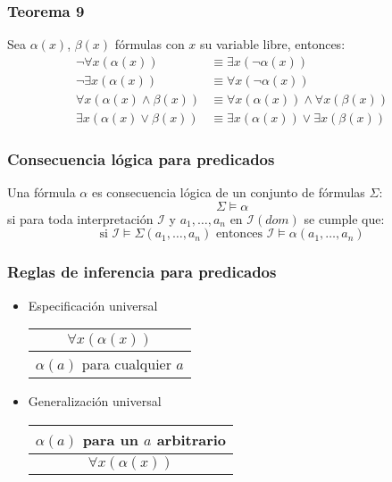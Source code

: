 \begin{multicols}{2}
    \subsubsection*{Teorema 9}
    Sea $\alpha(x)$, $\beta(x)$ fórmulas con $x$ su variable libre, entonces:
    \begin{align*}
        \neg \forall x(\alpha(x)) &\equiv \exists x(\neg \alpha(x))\\
        \neg \exists x(\alpha(x)) &\equiv \forall x(\neg \alpha(x))\\
        \forall x(\alpha(x) \wedge \beta(x)) &\equiv \forall x(\alpha(x)) \wedge \forall x (\beta(x))\\
        \exists x(\alpha(x) \vee \beta(x)) &\equiv \exists x(\alpha(x)) \vee \exists x(\beta(x))    
    \end{align*}
    
    \subsubsection*{Consecuencia lógica para predicados}
    Una fórmula $\alpha$ es consecuencia lógica de un conjunto de fórmulas $\Sigma$:
        $$
        \Sigma \models \alpha
        $$
        si para toda interpretación $\mathcal{I}$ y $a_1,\ldots,a_n$ en $\mathcal{I}(dom)$ se cumple que:
        $$
        \text{si } \mathcal{I} \models \Sigma(a_1,\ldots, a_n) \text{ entonces } \mathcal{I} \models \alpha(a_1,\ldots,a_n)
        $$
    
    \subsubsection*{Reglas de inferencia para predicados}   
    
    \begin{itemize}
    \item Especificación universal
    \vspace{5px}
    
        \begin{tabular}{c}
            $\forall x (\alpha(x))$ \\ \hline
            $\alpha(a)$ para cualquier $a$
        \end{tabular}
    
    \item Generalización universal
    \vspace{5px}
    
    
    \begin{tabular}{c}
        $\alpha(a)$ para un $a$ arbitrario \\ \hline
        $\forall x (\alpha(x))$
    \end{tabular}
    

\end{itemize}
\end{multicols}
